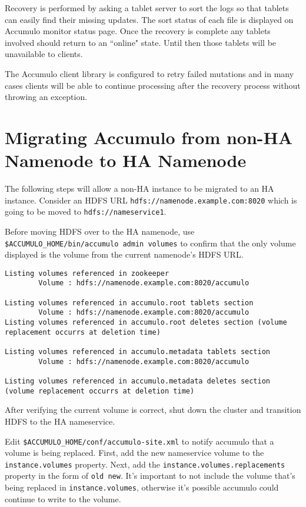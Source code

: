 Recovery is performed by asking a tablet server to sort the logs so that tablets can easily find their missing
updates. The sort status of each file is displayed on
Accumulo monitor status page. Once the recovery is complete any
tablets involved should return to an ``online" state. Until then those tablets will be
unavailable to clients.

The Accumulo client library is configured to retry failed mutations and in many
cases clients will be able to continue processing after the recovery process without
throwing an exception.

\section{Migrating Accumulo from non-HA Namenode to HA Namenode}

The following steps will allow a non-HA instance to be migrated to an HA instance. Consider an HDFS URL
\texttt{hdfs://namenode.example.com:8020} which is going to be moved to \texttt{hdfs://nameservice1}.

Before moving HDFS over to the HA namenode, use \texttt{\$ACCUMULO\_HOME/bin/accumulo admin volumes} to confirm
that the only volume displayed is the volume from the current namenode's HDFS URL.

\begingroup\fontsize{8pt}{8pt}\selectfont\begin{verbatim}
Listing volumes referenced in zookeeper
        Volume : hdfs://namenode.example.com:8020/accumulo

Listing volumes referenced in accumulo.root tablets section
        Volume : hdfs://namenode.example.com:8020/accumulo
Listing volumes referenced in accumulo.root deletes section (volume replacement occurrs at deletion time)

Listing volumes referenced in accumulo.metadata tablets section
        Volume : hdfs://namenode.example.com:8020/accumulo

Listing volumes referenced in accumulo.metadata deletes section (volume replacement occurrs at deletion time)
\end{verbatim}

After verifying the current volume is correct, shut down the cluster and transition HDFS to the HA nameservice.

Edit \texttt{\$ACCUMULO\_HOME/conf/accumulo-site.xml} to notify accumulo that a volume is being replaced. First,
add the new nameservice volume to the \texttt{instance.volumes} property. Next, add the
\texttt{instance.volumes.replacements} property in the form of \texttt{old new}. It's important to not include
the volume that's being replaced in \texttt{instance.volumes}, otherwise it's possible accumulo could continue
to write to the volume.

